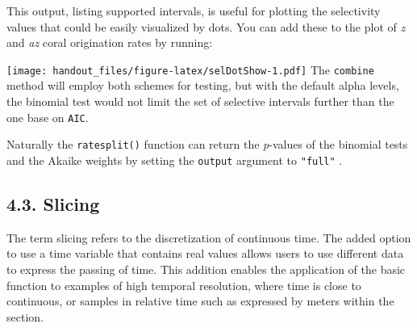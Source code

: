 \documentclass[]{article}
\newenvironment{Shaded}{\begin{snugshade}}{\end{snugshade}}
\newcommand{\KeywordTok}[1]{\textcolor[rgb]{0.13,0.29,0.53}{\textbf{{#1}}}}
\newcommand{\DataTypeTok}[1]{\textcolor[rgb]{0.13,0.29,0.53}{{#1}}}
\newcommand{\DecValTok}[1]{\textcolor[rgb]{0.00,0.00,0.81}{{#1}}}
\newcommand{\StringTok}[1]{\textcolor[rgb]{0.31,0.60,0.02}{{#1}}}
\newcommand{\CommentTok}[1]{\textcolor[rgb]{0.56,0.35,0.01}{\textit{{#1}}}}
\newcommand{\NormalTok}[1]{{#1}}
\begin{document}
This output, listing supported intervals, is useful for plotting the
selectivity values that could be easily visualized by dots. You can add
these to the plot of \emph{z} and \emph{az} coral origination rates by
running:

\begin{Shaded}
\end{Shaded}

\texttt{[image: handout\_files/figure-latex/selDotShow-1.pdf]} The
\texttt{combine} method will employ both schemes for testing, but with
the default alpha levels, the binomial test would not limit the set of
selective intervals further than the one base on \texttt{AIC}.

Naturally the \texttt{ratesplit()} function can return the
\emph{p}-values of the binomial tests and the Akaike weights by setting
the \texttt{output} argument to \texttt{"full"} .

\subsection{4.3. Slicing}\label{slicing}

The term slicing refers to the discretization of continuous time. The
added option to use a time variable that contains real values allows
users to use different data to express the passing of time. This
addition enables the application of the basic function to examples of
high temporal resolution, where time is close to continuous, or samples
in relative time such as expressed by meters within the section.
\end{document}
